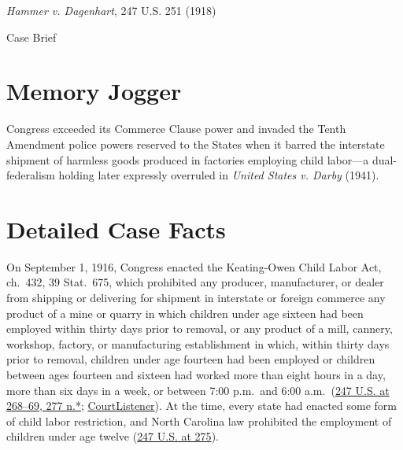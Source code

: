 \documentclass[12pt]{article}
\begin{document}
\begin{center}
{\LARGE \textit{Hammer v. Dagenhart}, 247 U.S. 251 (1918)\par}
\vspace{0.8em}
{\large Case Brief\par}
\end{center}
\vspace{1em}

\section{Memory Jogger}
Congress exceeded its Commerce Clause power and invaded the Tenth Amendment police powers reserved to the States when it barred the interstate shipment of harmless goods produced in factories employing child labor---a dual-federalism holding later expressly overruled in \textit{United States v. Darby} (1941).

\section{Detailed Case Facts}
On September 1, 1916, Congress enacted the Keating-Owen Child Labor Act, ch.\ 432, 39 Stat.\ 675, which prohibited any producer, manufacturer, or dealer from shipping or delivering for shipment in interstate or foreign commerce any product of a mine or quarry in which children under age sixteen had been employed within thirty days prior to removal, or any product of a mill, cannery, workshop, factory, or manufacturing establishment in which, within thirty days prior to removal, children under age fourteen had been employed or children between ages fourteen and sixteen had worked more than eight hours in a day, more than six days in a week, or between 7:00 p.m.\ and 6:00 a.m.\ (\href{https://supreme.justia.com/cases/federal/us/247/251/}{247 U.S. at 268--69, 277 n.*}; \href{https://www.courtlistener.com/opinion/99190/hammer-v-dagenhart/}{CourtListener}). At the time, every state had enacted some form of child labor restriction, and North Carolina law prohibited the employment of children under age twelve (\href{https://supreme.justia.com/cases/federal/us/247/251/}{247 U.S. at 275}).
\end{document}
